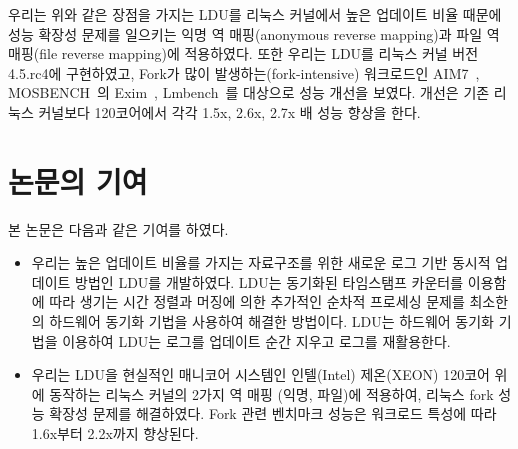 우리는 위와 같은 장점을 가지는 LDU를 리눅스 커널에서 높은 업데이트 비율 때문에 성능 확장성 
문제를 일으키는 익명 역 매핑(anonymous reverse mapping)과 파일 역 매핑(file reverse mapping)에
적용하였다.
또한 우리는 LDU를 리눅스 커널 버전 4.5.rc4에 구현하였고, Fork가 많이 발생하는(fork-intensive) 워크로드인
AIM7~\cite{AIM7Benchmark}, MOSBENCH~\cite{MOSBENCH}의 Exim~\cite{Exim},
Lmbench~\cite{mcvoy1996lmbench}를 대상으로 성능 개선을 보였다.
개선은 기존 리눅스 커널보다 120코어에서 각각 1.5x, 2.6x, 2.7x 배 성능 향상을 한다.

\newpage
\section{논문의 기여}\label{sec:introcontri}
본 논문은 다음과 같은 기여를 하였다.
\begin{itemize}
\item 우리는 높은 업데이트 비율를 가지는 자료구조를 위한 새로운 로그 기반 동시적 업데이트
 방법인 LDU를 개발하였다.
LDU는 동기화된 타임스탬프 카운터를 이용함에 따라 생기는 시간 정렬과 머징에 의한 추가적인
순차적 프로세싱 문제를 최소한의 하드웨어 동기화 기법을 사용하여 해결한 방법이다.
LDU는 하드웨어 동기화 기법을 이용하여 LDU는 로그를 업데이트 순간 지우고 로그를
재활용한다.
\item 
우리는 LDU을 현실적인 매니코어 시스템인 인텔(Intel) 제온(XEON)
 120코어 위에 동작하는 리눅스 커널의 2가지 역 매핑 (익명, 파일)에 적용하여, 리눅스 fork
 성능 확장성 문제를 해결하였다.
Fork 관련 벤치마크 성능은 워크로드 특성에 따라 1.6x부터 2.2x까지 향상된다.
\end{itemize}
